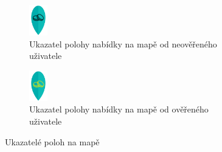 \begin{figure}[!h]\centering
    \begin{subfigure}[!h]{0.4\textwidth}
        \centering
        \includegraphics{media/marker.png}
        \caption{Ukazatel polohy nabídky na mapě od neověřeného uživatele}
        \label{fig:marker}
    \end{subfigure}
    \begin{subfigure}[!h]{0.4\textwidth}
        \centering
        \includegraphics{media/marker-verified.png}
        \caption{Ukazatel polohy nabídky na mapě od ověřeného uživatele}
        \label{fig:marker-verified}
    \end{subfigure}
    \caption{Ukazatelé poloh na mapě}
\end{figure}